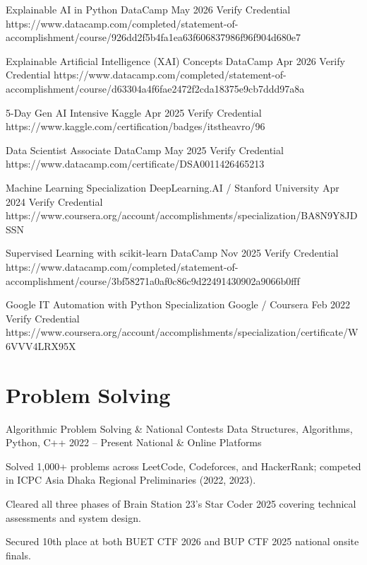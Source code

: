 \documentclass[11pt, a4paper]{article}
\begin{document}
\cvCert
    {Explainable AI in Python}
    {DataCamp}
    {May 2026}
    {Verify Credential}
    {https://www.datacamp.com/completed/statement-of-accomplishment/course/926dd2f5b4fa1ea63f606837986f96f904d680e7}

\cvCert
    {Explainable Artificial Intelligence (XAI) Concepts}
    {DataCamp}
    {Apr 2026}
    {Verify Credential}
    {https://www.datacamp.com/completed/statement-of-accomplishment/course/d63304a4f6fae2472f2cda18375e9cb7ddd97a8a}

\cvCert
    {5-Day Gen AI Intensive}
    {Kaggle}
    {Apr 2025}
    {Verify Credential}
    {https://www.kaggle.com/certification/badges/itstheavro/96}

\cvCert
    {Data Scientist Associate}
    {DataCamp}
    {May 2025}
    {Verify Credential}
    {https://www.datacamp.com/certificate/DSA0011426465213}

\cvCert
    {Machine Learning Specialization}
    {DeepLearning.AI / Stanford University}
    {Apr 2024}
    {Verify Credential}
    {https://www.coursera.org/account/accomplishments/specialization/BA8N9Y8JDSSN}

\cvCert
    {Supervised Learning with scikit-learn}
    {DataCamp}
    {Nov 2025}
    {Verify Credential}
    {https://www.datacamp.com/completed/statement-of-accomplishment/course/3bf58271a0af0c86c9d22491430902a9066b0fff}

\cvCert
    {Google IT Automation with Python Specialization}
    {Google / Coursera}
    {Feb 2022}
    {Verify Credential}
    {https://www.coursera.org/account/accomplishments/specialization/certificate/W6VVV4LRX95X}


\section{Problem Solving}
\cvProject
    {Algorithmic Problem Solving \& National Contests}
    {Data Structures, Algorithms, Python, C++}
    {2022 -- Present}
    {National \& Online Platforms}
    {
        \item Solved 1,000+ problems across LeetCode, Codeforces, and HackerRank; competed in ICPC Asia Dhaka Regional Preliminaries (2022, 2023).
        \item Cleared all three phases of Brain Station 23's Star Coder 2025 covering technical assessments and system design.
        \item Secured 10th place at both BUET CTF 2026 and BUP CTF 2025 national onsite finals.

    }
\end{document}
